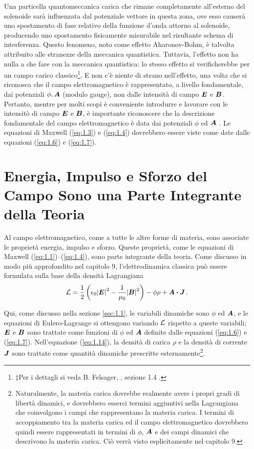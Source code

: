 Una particella quantomeccanica carica che rimane completamente all'esterno del solenoide sarà influenzata dal potenziale vettore in questa zona, ove esso causerà uno spostamento di fase relativo della funzione d'onda attorno al solenoide, producendo uno spostamento fisicamente misurabile nel risultante schema di interferenza. Questo fenomeno, noto come effetto Aharonov-Bohm, è talvolta attribuito alle stranezze della meccanica quantistica. Tuttavia, l'effetto non ha nulla a che fare con la meccanica quantistica: lo stesso effetto si verificherebbe per un campo carico classico\footnote{$\ddagger$Per i dettagli si veda B. Felsager, , sezione 1.4 .}. 
E non c'è niente di strano nell'effetto, una volta che si riconosca che il campo elettromagnetico è rappresentato, a livello fondamentale, dai potenziali $\phi, \vb*{A}$ (modulo gauge), non dalle intensità di campo $\vb*{E}$ e $\vb*{B}$. Pertanto, mentre per molti scopi è conveniente introdurre e lavorare con le intensitò di campo $\vb*{E}$ e $\vb*{B}$, è importante riconoscere che la descrizione fondamentale del campo elettromagnetico è data dai potenziali $\phi$ ed $\vb*{A}$ . Le equazioni di Maxwell (\ref{eq:1.3}) e (\ref{eq:1.4}) dovrebbero essere viste come date dalle equazioni (\ref{eq:1.6}) e (\ref{eq:1.7}).


\section[Energia e Impulso del Campo]{Energia, Impulso e Sforzo del Campo Sono una Parte Integrante della Teoria}\label{sec:1.2}
Al campo elettromagnetico, come a tutte le altre forme di materia, sono associate le proprietà energia, impulso e sforzo. Queste proprietà, come le equazioni di Maxwell (\ref{eq:1.1})--(\ref{eq:1.4}), sono parte integrante della teoria. Come discusso in modo più approfondito nel capitolo 9, l'elettrodinamica classica può essere formulata sulla base della densità Lagrangiana  
\begin{equation}\label{eq:1.14}
\cL = \frac{1}{2} \left(\epsilon_0 {\abs{\vb*{E}}}^2 - \frac{1}{\mu_0} {\abs{\vb*{B}}}^2 \right) - \phi \rho + \vb*{A} \vdot \vb*{J}\,.
\end{equation}

Qui, come discusso nella sezione \ref{sec:1.1}, le variabili dinamiche sono $\phi$ ed $\vb*{A}$, e le equazioni di Eulero-Lagrange si ottengono variando $\mathcal{L}$ rispetto a queste variabili; $\vb*{E}$ e $\vb*{B}$ sono trattate come funzioni di $\phi$ ed $\vb*{A}$ definite dalle equazioni (\ref{eq:1.6}) e (\ref{eq:1.7}). Nell'equazione (\ref{eq:1.14}), la densità di carica $\rho$ e la densità di corrente $\vb*{J}$ sono trattate come quantità dinamiche prescritte 
esternamente\footnote{Naturalmente, la materia carica dovrebbe realmente avere i propri gradi di libertà dinamici, e dovrebbero esserci termini aggiuntivi nella Lagrangiana che coinvolgono i campi che rappresentano la materia carica. I termini di accoppiamento tra la materia carica ed il campo elettromagnetico dovrebbero quindi essere rappresentati in termini di $\phi$, $\vb*{A}$ e dei campi dinamici che descrivono la materia carica. Ciò verrà visto esplicitamente nel capitolo 9.}. 


